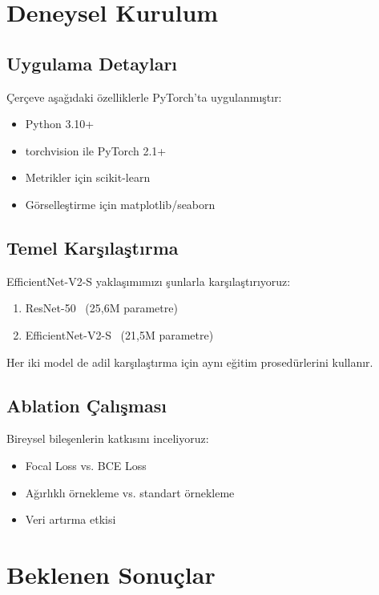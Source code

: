 \documentclass[12pt,a4paper]{article}
\begin{document}
\section{Deneysel Kurulum}
\label{sec:experiments}

\subsection{Uygulama Detayları}

Çerçeve aşağıdaki özelliklerle PyTorch'ta uygulanmıştır:
\begin{itemize}
    \item Python 3.10+
    \item torchvision ile PyTorch 2.1+
    \item Metrikler için scikit-learn
    \item Görselleştirme için matplotlib/seaborn
\end{itemize}

\subsection{Temel Karşılaştırma}

EfficientNet-V2-S yaklaşımımızı şunlarla karşılaştırıyoruz:
\begin{enumerate}
    \item ResNet-50~\cite{he2016} (25,6M parametre)
    \item EfficientNet-V2-S~\cite{tan2021} (21,5M parametre)
\end{enumerate}

Her iki model de adil karşılaştırma için aynı eğitim prosedürlerini kullanır.

\subsection{Ablation Çalışması}

Bireysel bileşenlerin katkısını inceliyoruz:
\begin{itemize}
    \item Focal Loss vs. BCE Loss
    \item Ağırlıklı örnekleme vs. standart örnekleme
    \item Veri artırma etkisi
\end{itemize}

\section{Beklenen Sonuçlar}
\label{sec:results}
\end{document}
